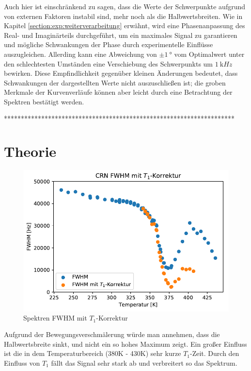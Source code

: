 Auch hier ist einschränkend zu sagen, dass die Werte der Schwerpunkte aufgrund von externen Faktoren instabil sind, mehr noch als die Halbwertsbreiten. Wie in Kapitel \ref{section:exp:weiterverarbeitung} erwähnt, wird eine Phasenanpassung des Real- und Imaginärteils durchgeführt, um ein maximales Signal zu garantieren und mögliche Schwankungen der Phase durch experimentelle Einflüsse auszugleichen. Allerding kann eine Abweichung von $\pm \SI{1}{\degree}$ vom Optimalwert unter den schlechtesten Umständen eine Verschiebung des Schwerpunkts um $\SI{1}{\kilo Hz}$ bewirken. Diese Empfindlichkeit gegenüber kleinen Änderungen bedeutet, dass Schwankungen der dargestellten Werte nicht auszuschließen ist; die groben Merkmale der Kurvenverläufe können aber leicht durch eine Betrachtung der Spektren bestätigt werden.




********************************************************************











\section{Theorie} \label{section:res:theorie}






\begin{figure}
	\begin{center}
		\includegraphics[width=\textwidth]{graphics/plots/SPEK/spek_t1korr.pdf}
	\end{center}
	\caption{Spektren FWHM mit $T_1$-Korrektur} \label{fig:res:spek_fwhm_t1}
\end{figure}
Aufgrund der Bewegungsverschmälerung würde man annehmen, dass die Halbwertsbreite sinkt, und nicht ein so hohes Maximum zeigt. Ein großer Einfluss ist die in dem Temperaturbereich (380K - 430K) sehr kurze $T_1$-Zeit. Durch den Einfluss von $T_1$ fällt das Signal sehr stark ab und verbreitert so das Spektrum.

